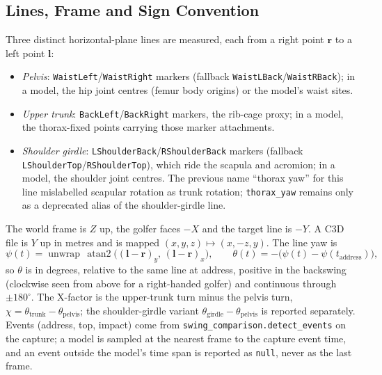 \documentclass[11pt,a4paper]{article}
\begin{document}
\subsection{Lines, Frame and Sign Convention}
Three distinct horizontal-plane lines are measured, each from a right point $\mathbf{r}$ to a left point $\mathbf{l}$:
\begin{itemize}
\item \emph{Pelvis}: \texttt{WaistLeft}/\texttt{WaistRight} markers (fallback \texttt{WaistLBack}/\texttt{WaistRBack}); in a model, the hip joint centres (femur body origins) or the model's waist sites.
\item \emph{Upper trunk}: \texttt{BackLeft}/\texttt{BackRight} markers, the rib-cage proxy; in a model, the thorax-fixed points carrying those marker attachments.
\item \emph{Shoulder girdle}: \texttt{LShoulderBack}/\texttt{RShoulderBack} markers (fallback \texttt{LShoulderTop}/\texttt{RShoulderTop}), which ride the scapula and acromion; in a model, the shoulder joint centres. The previous name ``thorax yaw'' for this line mislabelled scapular rotation as trunk rotation; \texttt{thorax\_yaw} remains only as a deprecated alias of the shoulder-girdle line.
\end{itemize}
The world frame is $Z$ up, the golfer faces $-X$ and the target line is $-Y$. A C3D file is $Y$ up in metres and is mapped $(x,y,z)\mapsto(x,-z,y)$. The line yaw is
\begin{equation}
\psi(t) = \operatorname{unwrap}\,\operatorname{atan2}\big((\mathbf{l}-\mathbf{r})_y,\,(\mathbf{l}-\mathbf{r})_x\big),
\qquad
\theta(t) = -\big(\psi(t)-\psi(t_{\mathrm{address}})\big),
\end{equation}
so $\theta$ is in degrees, relative to the same line at address, positive in the backswing (clockwise seen from above for a right-handed golfer) and continuous through $\pm180^\circ$. The X-factor is the upper-trunk turn minus the pelvis turn, $\chi=\theta_{\mathrm{trunk}}-\theta_{\mathrm{pelvis}}$; the shoulder-girdle variant $\theta_{\mathrm{girdle}}-\theta_{\mathrm{pelvis}}$ is reported separately. Events (address, top, impact) come from \texttt{swing\_comparison.detect\_events} on the capture; a model is sampled at the nearest frame to the capture event time, and an event outside the model's time span is reported as \texttt{null}, never as the last frame.
\end{document}

